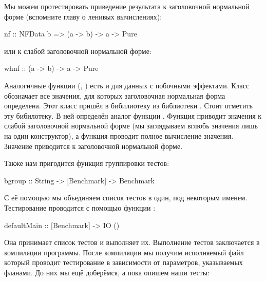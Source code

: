 Мы можем протестировать приведение результата к заголовочной нормальной
форме (вспомните главу о ленивых вычислениях):


\begin{code}
nf :: NFData b => (a -> b) -> a -> Pure
\end{code}

или к слабой заголовочной нормальной форме:


\begin{code}
whnf :: (a -> b) -> a -> Pure
\end{code}

Аналогичные функции (, ) есть и для данных с
побочными эффектами. Класс  обозначает все значения, для
которых заголовочная нормальная форма определена. Этот класс пришёл в
бибилиотеку  из библиотеки . Стоит отметить
эту бибилотеку. В ней определён аналог функции . Функция
 приводит значения к слабой заголовочной нормальной форме (мы
заглядываем вглюбь значения лишь на один конструктор), а функция
 проводит полное вычисление значения. Значение приводится к
заголовочной нормальной форме.

Также нам пригодится функция группировки тестов:


\begin{code}
bgroup :: String -> [Benchmark] -> Benchmark
\end{code}

С её помощью мы объединяем список тестов в один, под некоторым именем.
Тестирование проводится с помощью функции :


\begin{code}
defaultMain :: [Benchmark] -> IO ()
\end{code}

Она принимает список тестов и выполняет их. Выполнение тестов
заключается в компиляции программы. После компиляции мы получим
исполняемый файл который проводит тестирование в зависимости от
параметров, указываемых фланами. До них мы ещё доберёмся, а пока опишем
наши тесты:



